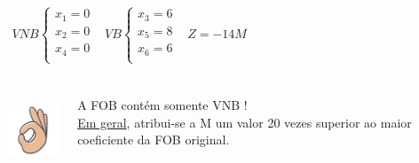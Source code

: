 \begin{frame}
{	}
	\only<4-5>
	{
			\vspace{0.5cm}
			\centering
			$
				\begin{matrix}
					VNB \left\{ 
								\begin{matrix}
												x_1 = 0 \\
												x_2 = 0 \\
												x_4 = 0 \\
								\end{matrix}
						\right. &
					VB \left\{
								\begin{matrix}
									x_3 = 6 \\
									x_5 = 8 \\
									x_6 = 6 \\
								\end{matrix}
						\right. 
					& Z = -14M\\
				\end{matrix}
			$
	}
	\only<5>
	{
		\begin{columns}
			\begin{column}{1cm}
				\includegraphics[width=2cm,height=2cm]{OK.png}
			\end{column}
			\begin{column}{9cm}
				\color{red}\Large A FOB contém somente VNB ! \\
				\color{black}\normalsize \underline{Em geral}, atribui-se a M um valor 20 vezes superior ao maior coeficiente da FOB original.
			\end{column}
		\end{columns}
	}	
\end{frame}

